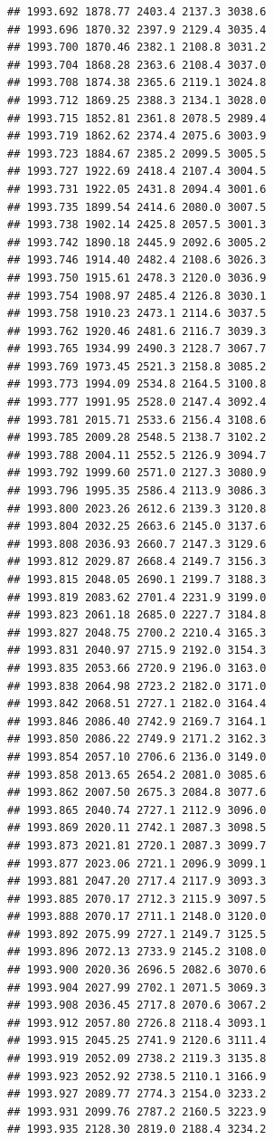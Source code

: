 \documentclass[
]{book}
\begin{document}
\begin{verbatim}
## 1993.692 1878.77 2403.4 2137.3 3038.6
## 1993.696 1870.32 2397.9 2129.4 3035.4
## 1993.700 1870.46 2382.1 2108.8 3031.2
## 1993.704 1868.28 2363.6 2108.4 3037.0
## 1993.708 1874.38 2365.6 2119.1 3024.8
## 1993.712 1869.25 2388.3 2134.1 3028.0
## 1993.715 1852.81 2361.8 2078.5 2989.4
## 1993.719 1862.62 2374.4 2075.6 3003.9
## 1993.723 1884.67 2385.2 2099.5 3005.5
## 1993.727 1922.69 2418.4 2107.4 3004.5
## 1993.731 1922.05 2431.8 2094.4 3001.6
## 1993.735 1899.54 2414.6 2080.0 3007.5
## 1993.738 1902.14 2425.8 2057.5 3001.3
## 1993.742 1890.18 2445.9 2092.6 3005.2
## 1993.746 1914.40 2482.4 2108.6 3026.3
## 1993.750 1915.61 2478.3 2120.0 3036.9
## 1993.754 1908.97 2485.4 2126.8 3030.1
## 1993.758 1910.23 2473.1 2114.6 3037.5
## 1993.762 1920.46 2481.6 2116.7 3039.3
## 1993.765 1934.99 2490.3 2128.7 3067.7
## 1993.769 1973.45 2521.3 2158.8 3085.2
## 1993.773 1994.09 2534.8 2164.5 3100.8
## 1993.777 1991.95 2528.0 2147.4 3092.4
## 1993.781 2015.71 2533.6 2156.4 3108.6
## 1993.785 2009.28 2548.5 2138.7 3102.2
## 1993.788 2004.11 2552.5 2126.9 3094.7
## 1993.792 1999.60 2571.0 2127.3 3080.9
## 1993.796 1995.35 2586.4 2113.9 3086.3
## 1993.800 2023.26 2612.6 2139.3 3120.8
## 1993.804 2032.25 2663.6 2145.0 3137.6
## 1993.808 2036.93 2660.7 2147.3 3129.6
## 1993.812 2029.87 2668.4 2149.7 3156.3
## 1993.815 2048.05 2690.1 2199.7 3188.3
## 1993.819 2083.62 2701.4 2231.9 3199.0
## 1993.823 2061.18 2685.0 2227.7 3184.8
## 1993.827 2048.75 2700.2 2210.4 3165.3
## 1993.831 2040.97 2715.9 2192.0 3154.3
## 1993.835 2053.66 2720.9 2196.0 3163.0
## 1993.838 2064.98 2723.2 2182.0 3171.0
## 1993.842 2068.51 2727.1 2182.0 3164.4
## 1993.846 2086.40 2742.9 2169.7 3164.1
## 1993.850 2086.22 2749.9 2171.2 3162.3
## 1993.854 2057.10 2706.6 2136.0 3149.0
## 1993.858 2013.65 2654.2 2081.0 3085.6
## 1993.862 2007.50 2675.3 2084.8 3077.6
## 1993.865 2040.74 2727.1 2112.9 3096.0
## 1993.869 2020.11 2742.1 2087.3 3098.5
## 1993.873 2021.81 2720.1 2087.3 3099.7
## 1993.877 2023.06 2721.1 2096.9 3099.1
## 1993.881 2047.20 2717.4 2117.9 3093.3
## 1993.885 2070.17 2712.3 2115.9 3097.5
## 1993.888 2070.17 2711.1 2148.0 3120.0
## 1993.892 2075.99 2727.1 2149.7 3125.5
## 1993.896 2072.13 2733.9 2145.2 3108.0
## 1993.900 2020.36 2696.5 2082.6 3070.6
## 1993.904 2027.99 2702.1 2071.5 3069.3
## 1993.908 2036.45 2717.8 2070.6 3067.2
## 1993.912 2057.80 2726.8 2118.4 3093.1
## 1993.915 2045.25 2741.9 2120.6 3111.4
## 1993.919 2052.09 2738.2 2119.3 3135.8
## 1993.923 2052.92 2738.5 2110.1 3166.9
## 1993.927 2089.77 2774.3 2154.0 3233.2
## 1993.931 2099.76 2787.2 2160.5 3223.9
## 1993.935 2128.30 2819.0 2188.4 3234.2

\end{verbatim}
\end{document}
